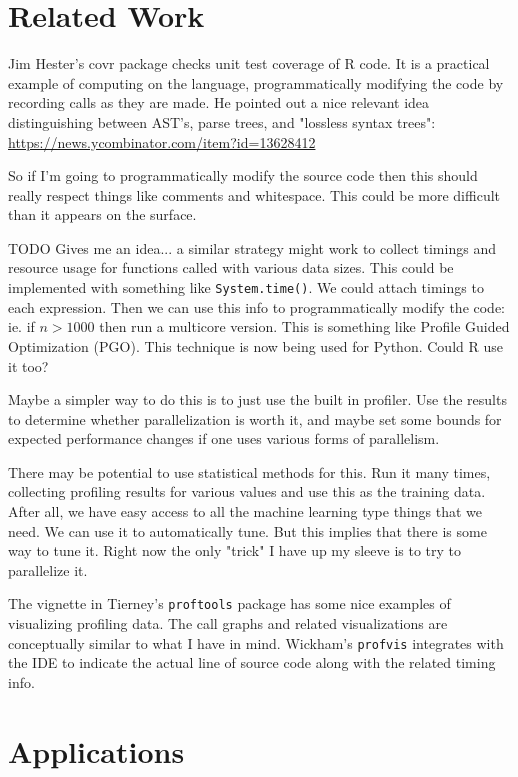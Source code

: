 \documentclass[12pt]{article}
\begin{document}
\section{Related Work}

Jim Hester's covr package \cite{R-covr} checks unit test coverage of R
code. It is a practical example of computing on the language,
programmatically modifying the code by recording calls as they are made.
He pointed out a nice relevant idea distinguishing between AST's, parse
trees, and "lossless syntax trees":
\url{https://news.ycombinator.com/item?id=13628412}

So if I'm going to programmatically modify the source code then this should really
respect things like comments and whitespace. This could be more difficult
than it appears on the surface.

TODO Gives me an idea... a similar strategy might work to collect timings and
resource usage for functions called with various data sizes. This could be
implemented with something like \texttt{System.time()}. We could
attach timings to each expression. Then we can
use this info to programmatically modify the code: ie. if $n > 1000$ then
run a multicore version. This is something like Profile Guided Optimization
(PGO). This technique is now being used for Python. Could R use it too?

Maybe a simpler way to do this is to just use the built in profiler. Use
the results to determine whether parallelization is worth it, and maybe set
some bounds for expected performance changes if one uses various forms of
parallelism. 

There may be potential to use statistical methods for this.
Run it many times, collecting profiling results for various values and use
this as the training data. After all, we have easy access to all the
machine learning type things that we need. We can use it to automatically
tune. But this implies that there is some way to tune it. Right now the
only "trick" I have up my sleeve is to try to parallelize it.

The vignette in Tierney's \texttt{proftools} package has some nice examples
of visualizing profiling data. The call graphs and related visualizations
are conceptually similar to what I have in mind.
Wickham's \texttt{profvis} integrates with the IDE to indicate the actual
line of source code along with the related timing info.


\section{Applications}
\end{document}
